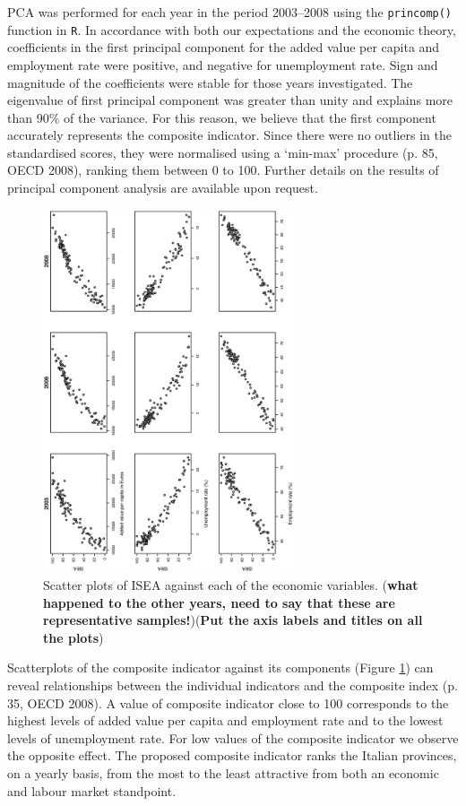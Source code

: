 \documentclass[10pt]{article}
\theoremstyle{definition}
\theoremstyle{plain}
\begin{document}
PCA was performed for each year in the period 2003--2008 using the \texttt{princomp()} function in \texttt{R}. In accordance with both our expectations and the economic theory, coefficients in the first principal component for the added value per capita and employment rate were positive, and negative for unemployment rate. Sign and magnitude of the coefficients were stable for those years investigated. The eigenvalue of first principal component was greater than unity and explains more than 90\% of the variance. For this reason, we believe that the first component accurately represents the composite indicator. Since there were no outliers in the standardised scores, they were normalised using a `min-max' procedure (p. 85, OECD 2008), ranking them between 0 to 100. Further details on the results of principal component analysis are available upon request.
 
\begin{figure}[tbp]
\centering
	\includegraphics[width=0.66\textwidth, angle=270]{sensitivity.eps}
\caption{Scatter plots of ISEA against each of the economic variables. (\textbf{what happened to the other years, need to say that these are representative samples!})(\textbf{Put the axis labels and titles on all the plots})}
	\label{fig4}
\end{figure}

Scatterplots of the composite indicator against its components (Figure \ref{fig4}) can reveal relationships between the individual indicators and the composite index (p. 35, OECD 2008). A value of composite indicator close to 100 corresponds to the highest levels of added value per capita and employment rate and to the lowest levels of unemployment rate. For low values of the composite indicator we observe the opposite effect. The proposed composite indicator ranks the Italian provinces, on a yearly basis, from the most to the least attractive from both an economic and labour market standpoint.
\end{document}

